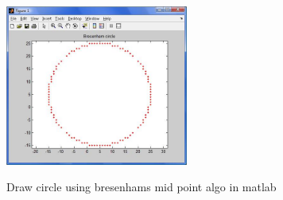\begin{figure}[ht!]
\centering
\includegraphics[width=60mm, height=60mm]{circleMatLab.png}
\caption{Draw circle using bresenhams mid point algo in  matlab \label{overflow}}
\end{figure}

